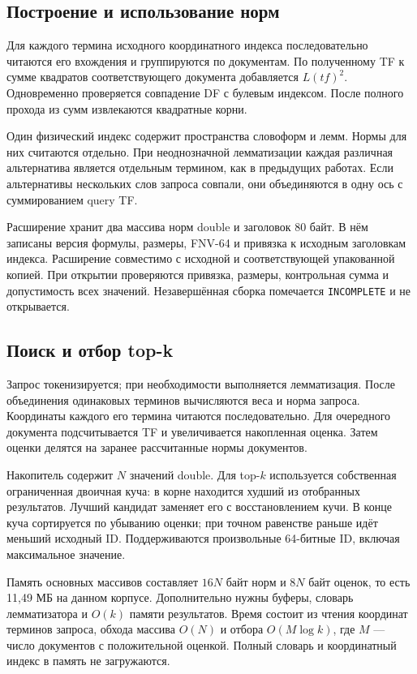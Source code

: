 \documentclass[12pt,a4paper]{article}
\begin{document}
\subsection{Построение и использование норм}
Для каждого термина исходного координатного индекса последовательно
читаются его вхождения и группируются по документам. По полученному TF
к сумме квадратов соответствующего документа добавляется $L(tf)^2$.
Одновременно проверяется совпадение DF с булевым индексом.
После полного прохода из сумм извлекаются квадратные корни.

Один физический индекс содержит пространства словоформ и лемм.
Нормы для них считаются отдельно. При неоднозначной лемматизации каждая
различная альтернатива является отдельным термином, как в предыдущих работах.
Если альтернативы нескольких слов запроса совпали, они объединяются
в одну ось с суммированием query TF.

Расширение хранит два массива норм double и заголовок 80 байт.
В нём записаны версия формулы, размеры, FNV-64 и привязка к исходным
заголовкам индекса. Расширение совместимо с исходной и соответствующей
упакованной копией. При открытии проверяются привязка, размеры,
контрольная сумма и допустимость всех значений.
Незавершённая сборка помечается \texttt{INCOMPLETE} и не открывается.

\subsection{Поиск и отбор top-k}
Запрос токенизируется; при необходимости выполняется лемматизация.
После объединения одинаковых терминов вычисляются веса и норма запроса.
Координаты каждого его термина читаются последовательно. Для очередного
документа подсчитывается TF и увеличивается накопленная оценка.
Затем оценки делятся на заранее рассчитанные нормы документов.

Накопитель содержит $N$ значений double. Для top-$k$ используется собственная
ограниченная двоичная куча: в корне находится худший из отобранных результатов.
Лучший кандидат заменяет его с восстановлением кучи. В конце куча сортируется
по убыванию оценки; при точном равенстве раньше идёт меньший исходный ID.
Поддерживаются произвольные 64-битные ID, включая максимальное значение.

Память основных массивов составляет $16N$ байт норм и $8N$ байт оценок,
то есть 11,49 МБ на данном корпусе. Дополнительно нужны буферы, словарь
лемматизатора и $O(k)$ памяти результатов. Время состоит из чтения координат
терминов запроса, обхода массива $O(N)$ и отбора $O(M\log k)$,
где $M$ --- число документов с положительной оценкой.
Полный словарь и координатный индекс в память не загружаются.
\end{document}

